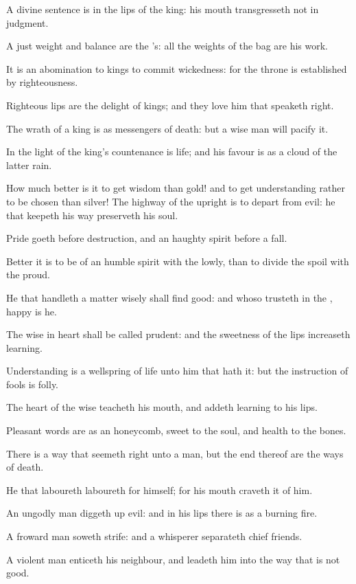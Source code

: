 \Verse A divine sentence is in the lips of the king: his mouth transgresseth not in judgment.

\Verse A just weight and balance are the \LORD's: all the weights of the bag are his work.

\Verse It is an abomination to kings to commit wickedness: for the throne is established by righteousness.

\Verse Righteous lips are the delight of kings; and they love him that speaketh right.

\Verse The wrath of a king is as messengers of death: but a wise man will pacify it.

\Verse In the light of the king's countenance is life; and his favour is as a cloud of the latter rain.

\Verse How much better is it to get wisdom than gold! and to get understanding rather to be chosen than silver!  \Verse The highway of the upright is to depart from evil: he that keepeth his way preserveth his soul.

\Verse Pride goeth before destruction, and an haughty spirit before a fall.

\Verse Better it is to be of an humble spirit with the lowly, than to divide the spoil with the proud.

\Verse He that handleth a matter wisely shall find good: and whoso trusteth in the \LORD, happy is he.

\Verse The wise in heart shall be called prudent: and the sweetness of the lips increaseth learning.

\Verse Understanding is a wellspring of life unto him that hath it: but the instruction of fools is folly.

\Verse The heart of the wise teacheth his mouth, and addeth learning to his lips.

\Verse Pleasant words are as an honeycomb, sweet to the soul, and health to the bones.

\Verse There is a way that seemeth right unto a man, but the end thereof are the ways of death.

\Verse He that laboureth laboureth for himself; for his mouth craveth it of him.

\Verse An ungodly man diggeth up evil: and in his lips there is as a burning fire.

\Verse A froward man soweth strife: and a whisperer separateth chief friends.

\Verse A violent man enticeth his neighbour, and leadeth him into the way that is not good.

